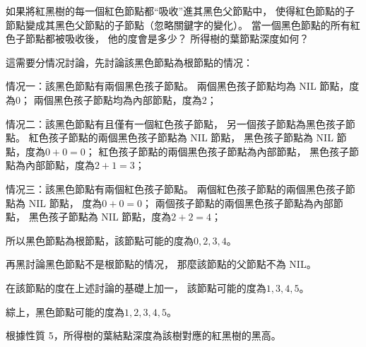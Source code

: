 \startEXERCISE
如果將紅黑樹的每一個紅色節點都“吸收”進其黑色父節點中，
使得紅色節點的子節點變成其黑色父節點的子節點（忽略關鍵字的變化）。
當一個黑色節點的所有紅色子節點都被吸收後，
他的度會是多少？
所得樹的葉節點深度如何？
\stopEXERCISE

\startANSWER
這需要分情况討論，先討論該黑色節點為根節點的情况：

情况一：該黑色節點有兩個黑色孩子節點。
兩個黑色孩子節點均為 NIL 節點，度為$0$；
兩個黑色孩子節點均為內部節點，度為$2$；

情况二：該黑色節點有且僅有一個紅色孩子節點，
另一個孩子節點為黑色孩子節點。
紅色孩子節點的兩個黑色孩子節點為 NIL 節點，
黑色孩子節點為 NIL 節點，度為$0+0=0$；
紅色孩子節點的兩個黑色孩子節點為內部節點，
黑色孩子節點為內部節點，度為$2+1=3$；

情况三：該黑色節點有兩個紅色孩子節點。
兩個紅色孩子節點的兩個黑色孩子節點為 NIL 節點，
度為$0+0=0$；
兩個孩子節點的兩個黑色孩子節點為內部節點，
黑色孩子節點為 NIL 節點，度為$2+2=4$；

所以黑色節點為根節點，該節點可能的度為$0,2,3,4$。

再黑討論黑色節點不是根節點的情况，
那麼該節點的父節點不為 NIL。

在該節點的度在上述討論的基礎上加一，
該節點可能的度為$1,3,4,5$。

綜上，黑色節點可能的度為$1,2,3,4,5$。

根據性質 5，所得樹的葉結點深度為該樹對應的紅黑樹的黑高。
\stopANSWER
